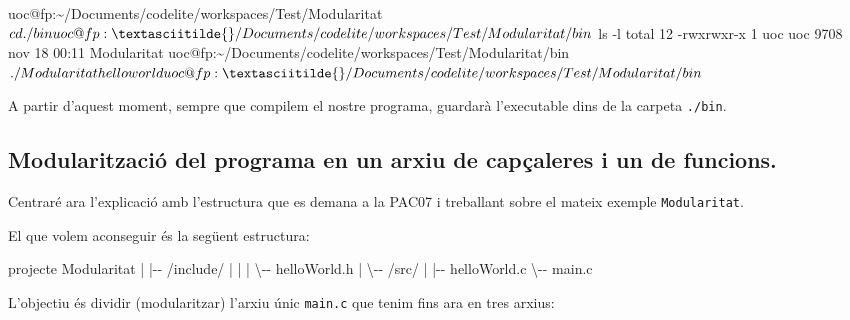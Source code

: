 \documentclass[]{book}
\newenvironment{Shaded}{\begin{snugshade}}{\end{snugshade}}
\newcommand{\BaseNTok}[1]{\textcolor[rgb]{0.00,0.00,0.81}{#1}}
\newcommand{\DecValTok}[1]{\textcolor[rgb]{0.00,0.00,0.81}{#1}}
\newcommand{\NormalTok}[1]{#1}
\begin{document}
\begin{Shaded}
\begin{Highlighting}[]
\NormalTok{uoc@fp:\textasciitilde{}/Documents/codelite/workspaces/Test/Modularitat$ cd ./bin}
\NormalTok{uoc@fp:\textasciitilde{}/Documents/codelite/workspaces/Test/Modularitat/bin$ ls {-}l}
\NormalTok{total }\DecValTok{12}
\NormalTok{{-}rwxrwxr{-}x }\DecValTok{1}\NormalTok{ uoc uoc }\DecValTok{9708}\NormalTok{ nov }\DecValTok{18} \BaseNTok{00}\NormalTok{:}\DecValTok{11}\NormalTok{ Modularitat}
\NormalTok{uoc@fp:\textasciitilde{}/Documents/codelite/workspaces/Test/Modularitat/bin$ ./Modularitat }
\NormalTok{hello world}
\NormalTok{uoc@fp:\textasciitilde{}/Documents/codelite/workspaces/Test/Modularitat/bin$}
\end{Highlighting}
\end{Shaded}

A partir d'aquest moment, sempre que compilem el nostre programa, guardarà l'executable dins de la carpeta \texttt{./bin}.

\hypertarget{modularitzacio-del-programa-en-un-arxiu-de-capcaleres-i-un-de-funcions.}{%
\subsection{Modularització del programa en un arxiu de capçaleres i un de funcions.}\label{modularitzacio-del-programa-en-un-arxiu-de-capcaleres-i-un-de-funcions.}}

Centraré ara l'explicació amb l'estructura que es demana a la PAC07 i treballant sobre el mateix exemple \texttt{Modularitat}.

El que volem aconseguir és la següent estructura:

\begin{Shaded}
\begin{Highlighting}[]
\NormalTok{projecte Modularitat}
\NormalTok{   |}
\NormalTok{   |{-}{-} /include/}
\NormalTok{   |     |}
\NormalTok{   |     \textbackslash{}{-}{-} helloWorld.h}
\NormalTok{   |}
\NormalTok{   \textbackslash{}{-}{-} /src/}
\NormalTok{         |}
\NormalTok{         |{-}{-} helloWorld.c}
\NormalTok{         \textbackslash{}{-}{-} main.c}
\end{Highlighting}
\end{Shaded}

L'objectiu és dividir (modularitzar) l'arxiu únic \texttt{main.c} que tenim fins ara en tres arxius:
\end{document}
